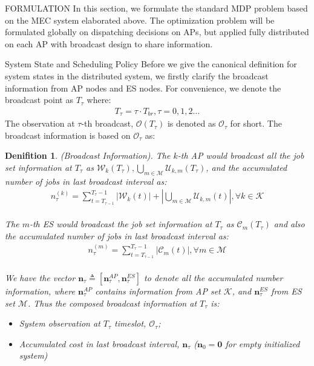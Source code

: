 \documentclass[10pt, conference, letterpaper]{IEEEtran}
\newtheorem{definition}{Denifition}
\newcommand{\define}{\triangleq}
\renewcommand{\vec}{\mathbf}
\newcommand{\apSet}{\mathcal{K}}
\newcommand{\esSet}{\mathcal{M}}
\newcommand{\wSet}{\mathcal{W}}
\newcommand{\uSet}{\mathcal{U}}
\newcommand{\cSet}{\mathcal{C}}
\newcommand{\Obsv}{\mathcal{O}}
\begin{document}
    \begin{section}{FORMULATION}
        \label{sec:formulation}
        In this section, we formulate the standard MDP problem based on the MEC system elaborated above. The optimization problem will be formulated globally on dispatching decisions on APs, but applied fully distributed on each AP with broadcast design to share information.

        \begin{subsection}{System State and Scheduling Policy}
            Before we give the canonical definition for system states in the distributed system, we firstly clarify the broadcast information from AP nodes and ES nodes. For convenience, we denote the broadcast point as $T_\tau$ where:
            \begin{align}
                T_\tau = \tau \cdot T_{br}, \tau=0,1,2\dots
            \end{align}
            The observation at $\tau$-th broadcast, $\Obsv(T_\tau)$ is denoted as $\Obsv_\tau$ for short. The broadcast information is based on $\Obsv_\tau$ as:
            \begin{definition}(Broadcast Information).
                The $k$-th AP would broadcast all the job set information at $T_\tau$ as $\wSet_{k}(T_\tau), \bigcup\limits_{m\in\esSet}\uSet_{k,m}(T_\tau)$, and the accumulated number of jobs in last broadcast interval as:
                \begin{align}
                    n^{(k)}_\tau = \sum_{t=T_{\tau-1}}^{T_\tau-1} |\wSet_{k}(t)| + |\bigcup\limits_{m\in\esSet}\uSet_{k,m}(t)|,\forall k \in \apSet
                \end{align}
                \\
                The $m$-th ES would broadcast the job set information at $T_\tau$ as $\cSet_{m}(T_\tau)$ and also the accumulated number of jobs in last broadcast interval as:
                \begin{align}
                    n^{(m)}_\tau = \sum_{t=T_{\tau-1}}^{T_\tau-1} |\cSet_{m}(t)|,\forall m \in \esSet
                \end{align}
                \\
                We have the vector $\vec{n}_\tau \define [\vec{n}^{AP}_{\tau}, \vec{n}^{ES}_{\tau}]$ to denote all the accumulated number information, where $\vec{n}^{AP}_{\tau}$ contains information from AP set $\apSet$, and $\vec{n}^{ES}_{\tau}$ from ES set $\esSet$. Thus the composed broadcast information at $T_\tau$ is:
                \begin{itemize}
                    \item System observation at $T_\tau$ timeslot, $\Obsv_\tau$;
                    \item Accumulated cost in last broadcast interval, $\vec{n}_\tau$ ($\vec{n}_0=\mathbf{0}$ for empty initialized system)
                \end{itemize}
            \end{definition}


\end{subsection}
\end{section}
\end{document}
